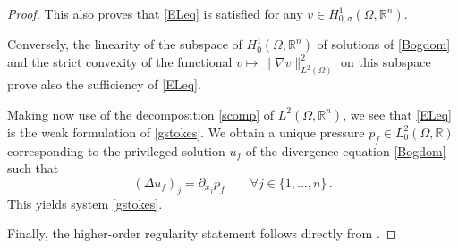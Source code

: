 \documentclass[11pt]{article}
\theoremstyle{plain}
\theoremstyle{definition}
\numberwithin{equation}{section}
\newcommand{\R}{\mathbb{R}}
\begin{document}
\begin{proof}
This also proves that \eqref{ELeq} is satisfied for any $v\in H^1_{0,\sigma}(\Omega,\R^n)$.\par
Conversely, the linearity of the subspace of $H^1_0(\Omega,\R^n)$
of solutions  of \eqref{Bogdom} and the strict convexity of the functional $v\mapsto \| \nabla v\|^2_{L^2(\Omega)}$ on this subspace prove
also the sufficiency of \eqref{ELeq}.
\par
Making now use of the decomposition \eqref{scomp} of $L^2(\Omega,\R^n)$, we see that \eqref{ELeq} is the weak formulation of \eqref{gstokes}.
We obtain a unique pressure $p_f\in L^2_0(\Omega,\R)$ corresponding to the privileged solution  $u_f$ of the divergence equation \eqref{Bogdom} such that
$$
(\Delta u_f)_j = \partial_{x_{j}} p_f \qquad \forall j \in \{1,...,n\} \, .
$$
This yields system \eqref{gstokes}.

Finally, the higher-order regularity statement follows directly from \cite[Theorem IV.5.8]{boyer2012mathematical}.
\end{proof}
\end{document}

